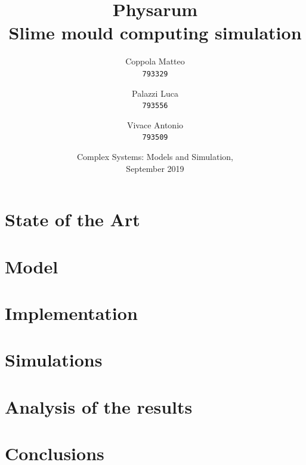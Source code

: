 \documentclass{report}
\begin{document}

\title{%
  \Huge Physarum\\
  \large Slime mould computing simulation\\
    }
\author{
  Coppola Matteo\\
  \texttt{793329}
  \and
  Palazzi Luca\\
  \texttt{793556}
   \and
  Vivace Antonio\\
  \texttt{793509}
}
\date{Complex Systems: Models and Simulation, \\ September 2019}
\maketitle


\tableofcontents
\listoffigures



\chapter{State of the Art}


\chapter{Model}


\chapter{Implementation}


\chapter{Simulations}


\chapter{Analysis of the results}


\chapter{Conclusions}




\end{document}
